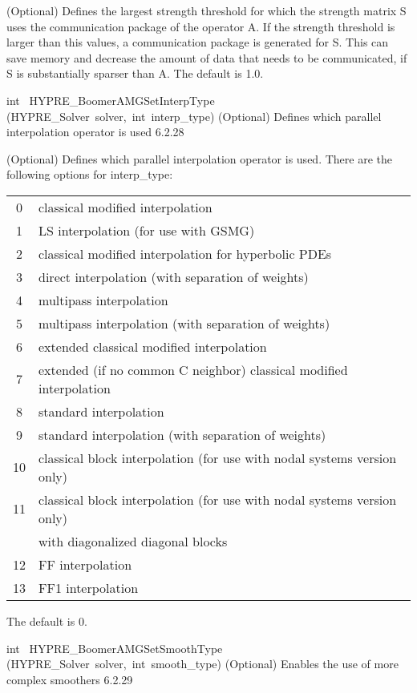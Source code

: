 \documentclass{article}
\begin{document}
\begin{cxxentry}
\begin{cxxentry}
\begin{cxxfunction}
\begin{cxxdoc}
(Optional) Defines the largest strength threshold for which 
the strength matrix S uses the communication package of the operator A.
If the strength threshold is larger than this values,
a communication package is generated for S. This can save
memory and decrease the amount of data that needs to be communicated,
if S is substantially sparser than A.
The default is 1.0.
\end{cxxdoc}
\end{cxxfunction}
\begin{cxxfunction}
{int\ }
        {HYPRE\_BoomerAMGSetInterpType}
        {(HYPRE\_Solver\ solver,\ int\ interp\_type)}
        {
(Optional) Defines which parallel interpolation operator is used}
        {6.2.28}
\begin{cxxdoc}

(Optional) Defines which parallel interpolation operator is used.
There are the following options for interp\_type: 

\begin{tabular}{|c|l|} \hline
0 &	classical modified interpolation \\
1 &	LS interpolation (for use with GSMG) \\
2 &	classical modified interpolation for hyperbolic PDEs \\
3 &	direct interpolation (with separation of weights) \\
4 &	multipass interpolation \\
5 &	multipass interpolation (with separation of weights) \\
6 &  extended classical modified interpolation \\
7 &  extended (if no common C neighbor) classical modified interpolation \\
8 &	standard interpolation \\
9 &	standard interpolation (with separation of weights) \\
10 &	classical block interpolation (for use with nodal systems version only) \\
11 &	classical block interpolation (for use with nodal systems version only) \\
&	with diagonalized diagonal blocks \\
12 &	FF interpolation \\
13 &	FF1 interpolation \\
\hline
\end{tabular}

The default is 0. 
\end{cxxdoc}
\end{cxxfunction}
\begin{cxxfunction}
{int\ }
        {HYPRE\_BoomerAMGSetSmoothType}
        {(HYPRE\_Solver\ solver,\ int\ smooth\_type)}
        {
(Optional) Enables the use of more complex smoothers}
        {6.2.29}
\begin{cxxdoc}


\end{cxxdoc}
\end{cxxfunction}
\end{cxxentry}
\end{cxxentry}
\end{document}
